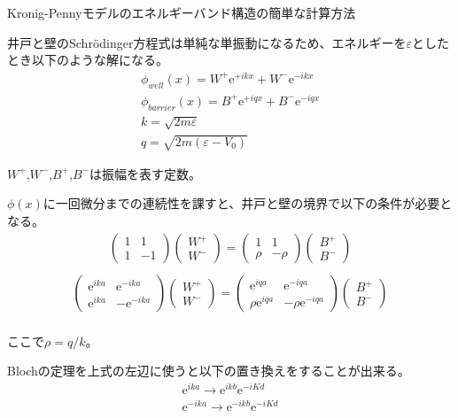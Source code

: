 \documentclass[a4paper, lualatex]{bxjsarticle}
\begin{document}
\begin{section}{Kronig-Pennyモデルのエネルギーバンド構造の簡単な計算方法}
    \label{AppK}
    \par 井戸と壁のSchrödinger方程式は単純な単振動になるため、エネルギーを$\varepsilon$としたとき以下のような解になる。
    \begin{align}
     \phi_{well}(x)=W^+\mathrm{e}^{+ikx}+W^-\mathrm{e}^{-ikx}\nonumber\\
        \phi_{barrier}(x)=B^+\mathrm{e}^{+iqx}+B^-\mathrm{e}^{-iqx}\nonumber\\
        k=\sqrt{2m\varepsilon}\nonumber\\
        q=\sqrt{2m(\varepsilon - V_0)}
    \end{align}
    \par $W^+$,$W^-$,$B^+$,$B^-$は振幅を表す定数。
    \par $\phi(x)$に一回微分までの連続性を課すと、井戸と壁の境界で以下の条件が必要となる。
    \begin{align}
     \begin{pmatrix} 1 & 1 \\ 1 & -1 \end{pmatrix}\begin{pmatrix} W^{ + } \\ W^{ - } \end{pmatrix}=\begin{pmatrix} 1 & 1 \\ \rho & -\rho \end{pmatrix}\begin{pmatrix} B^{ + } \\ B^{ - } \end{pmatrix}\nonumber\\
    \end{align}
    \begin{align}
     \begin{pmatrix} \mathrm{e}^{ika} & \mathrm{e}^{-ika} \\ \mathrm{e}^{ika} & -\mathrm{e}^{-ika} \end{pmatrix}\begin{pmatrix} W^{+} \\ W^{-} \end{pmatrix}=\begin{pmatrix} \mathrm{e}^{iqa} & \mathrm{e}^{-iqa} \\ \rho\mathrm{e}^{iqa} & -\rho \mathrm{e}^{-iqa} \end{pmatrix}\begin{pmatrix} B^{+} \\ B^{-} \end{pmatrix}\nonumber\\
    \end{align}
    \par ここで$\rho=q/k$。
    \par Blochの定理を上式の左辺に使うと以下の置き換えをすることが出来る。
    \begin{align}
        \mathrm{e}^{ika}\rightarrow\mathrm{e}^{ikb}\mathrm{e}^{-iKd}\\
        \mathrm{e}^{-ika}\rightarrow\mathrm{e}^{-ikb}\mathrm{e}^{-iKd}
    \end{align}
    \end{section}
\end{document}
